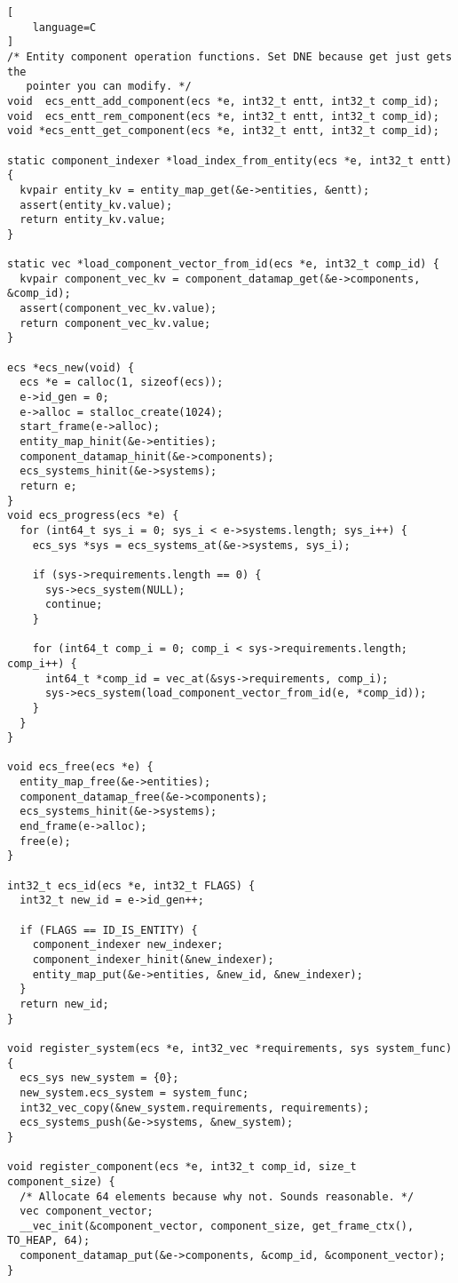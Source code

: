 \begin{lstlisting}[
    language=C
]
/* Entity component operation functions. Set DNE because get just gets the
   pointer you can modify. */
void  ecs_entt_add_component(ecs *e, int32_t entt, int32_t comp_id);
void  ecs_entt_rem_component(ecs *e, int32_t entt, int32_t comp_id);
void *ecs_entt_get_component(ecs *e, int32_t entt, int32_t comp_id);

static component_indexer *load_index_from_entity(ecs *e, int32_t entt) {
  kvpair entity_kv = entity_map_get(&e->entities, &entt);
  assert(entity_kv.value);
  return entity_kv.value;
}

static vec *load_component_vector_from_id(ecs *e, int32_t comp_id) {
  kvpair component_vec_kv = component_datamap_get(&e->components, &comp_id);
  assert(component_vec_kv.value);
  return component_vec_kv.value;
}

ecs *ecs_new(void) {
  ecs *e = calloc(1, sizeof(ecs));
  e->id_gen = 0;
  e->alloc = stalloc_create(1024);
  start_frame(e->alloc);
  entity_map_hinit(&e->entities);
  component_datamap_hinit(&e->components);
  ecs_systems_hinit(&e->systems);
  return e;
}
void ecs_progress(ecs *e) {
  for (int64_t sys_i = 0; sys_i < e->systems.length; sys_i++) {
    ecs_sys *sys = ecs_systems_at(&e->systems, sys_i);

    if (sys->requirements.length == 0) {
      sys->ecs_system(NULL);
      continue;
    }

    for (int64_t comp_i = 0; comp_i < sys->requirements.length; comp_i++) {
      int64_t *comp_id = vec_at(&sys->requirements, comp_i);
      sys->ecs_system(load_component_vector_from_id(e, *comp_id));
    }
  }
}

void ecs_free(ecs *e) {
  entity_map_free(&e->entities);
  component_datamap_free(&e->components);
  ecs_systems_hinit(&e->systems);
  end_frame(e->alloc);
  free(e);
}

int32_t ecs_id(ecs *e, int32_t FLAGS) {
  int32_t new_id = e->id_gen++;

  if (FLAGS == ID_IS_ENTITY) {
    component_indexer new_indexer;
    component_indexer_hinit(&new_indexer);
    entity_map_put(&e->entities, &new_id, &new_indexer);
  }
  return new_id;
}

void register_system(ecs *e, int32_vec *requirements, sys system_func) {
  ecs_sys new_system = {0};
  new_system.ecs_system = system_func;
  int32_vec_copy(&new_system.requirements, requirements);
  ecs_systems_push(&e->systems, &new_system);
}

void register_component(ecs *e, int32_t comp_id, size_t component_size) {
  /* Allocate 64 elements because why not. Sounds reasonable. */
  vec component_vector;
  __vec_init(&component_vector, component_size, get_frame_ctx(), TO_HEAP, 64);
  component_datamap_put(&e->components, &comp_id, &component_vector);
}


\end{lstlisting}
